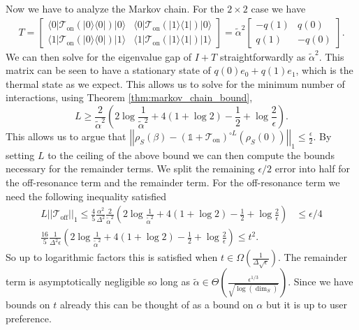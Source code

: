 \documentclass{article}
\newcommand{\on}{\text{on}}
\newcommand{\off}{\text{off}}
\newcommand{\ket}[1]{|#1\rangle}
\newcommand{\bra}[1]{\langle #1|}
\newcommand{\ketbra}[2]{| #1\rangle\! \langle #2|}
\newcommand{\parens}[1]{\left( #1 \right)}
\newcommand{\norm}[1]{\left| \left| #1 \right| \right|}
\newcommand{\identity}{\mathds{1}}
\begin{document}
Now we have to analyze the Markov chain. For the $2 \times 2$ case we have
\begin{align}
    T = \begin{bmatrix}
        \bra{0}\mathcal{T}_{\on}(\ketbra{0}{0}) \ket{0} & \bra{0}\mathcal{T}_{\on}(\ketbra{1}{1}) \ket{0} \\
        \bra{1}\mathcal{T}_{\on}(\ketbra{0}{0}) \ket{1} & \bra{1}\mathcal{T}_{\on}(\ketbra{1}{1}) \ket{1} 
    \end{bmatrix} = \widetilde{\alpha}^2 \begin{bmatrix} 
        - q(1) & q(0) \\ q(1) & - q(0)
    \end{bmatrix}.
\end{align}
We can then solve for the eigenvalue gap of $I + T$ straightforwardly as $\widetilde{\alpha}^2$. This matrix can be seen to have a stationary state of $q(0) e_0 + q(1) e_1$, which is the thermal state as we expect. This allows us to solve for the minimum number of interactions, using Theorem \ref{thm:markov_chain_bound},
\begin{equation}
    L \ge \frac{2}{\widetilde{\alpha}^2} \left( 2 \log \frac{1}{\widetilde{\alpha}^2} + 4( 1 + \log 2) - \frac{1}{2} + \log \frac{2}{\epsilon} \right).
\end{equation}
This allows us to argue that $\norm{\rho_S(\beta) - (\identity + \mathcal{T}_{\on})^{\circ L}(\rho_S(0)) }_1 \le \frac{\epsilon}{2}$. By setting $L$ to the ceiling of the above bound we can then compute the bounds necessary for the remainder terms. We split the remaining $\epsilon / 2$ error into half for the off-resonance term and the remainder term. For the off-resonance term we need the following inequality satisfied 
\begin{align}
    L \norm{\mathcal{T}_{\off}}_1 \le \frac{4}{5} \frac{\alpha^2}{\Delta^2}\frac{2}{\widetilde{\alpha}^2}\left(  2 \log \frac{1}{\widetilde{\alpha}^2} + 4( 1 + \log 2) - \frac{1}{2} + \log \frac{2}{\epsilon} \right) &\le \epsilon / 4 \\
    \frac{16}{5} \frac{1}{\Delta^2 \epsilon} \left(  2 \log \frac{1}{\widetilde{\alpha}^2} + 4( 1 + \log 2) - \frac{1}{2} + \log \frac{2}{\epsilon} \right) \le t^2.
\end{align}
So up to logarithmic factors this is satisfied when $t \in \Omega \left( \frac{1}{\Delta \sqrt{\epsilon}} \right)$. The remainder term is asymptotically negligible so long as $\widetilde{\alpha} \in \Theta \parens{\frac{\epsilon^{1/3}}{\sqrt{\log(\dim_S)}}}$. Since we have bounds on $t$ already this can be thought of as a bound on $\alpha$ but it is up to user preference. 
\end{document}
